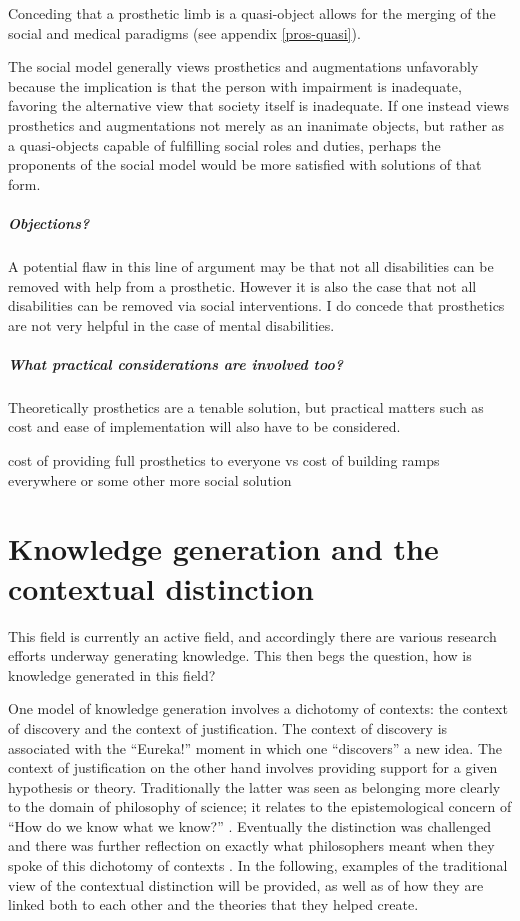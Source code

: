 \documentclass[a4paper]{article}
\begin{document}
Conceding that a prosthetic limb is a quasi-object allows for the merging of
the social and medical paradigms (see appendix \autoref{pros-quasi}).

The social model generally views prosthetics and augmentations unfavorably
because the implication is that the person with impairment is inadequate,
favoring the alternative view that society itself is inadequate. If one
instead views prosthetics and augmentations not merely as an inanimate
objects, but rather as a quasi-objects capable of fulfilling social roles and
duties, perhaps the proponents of the social model would be more satisfied
with solutions of that form.

\subparagraph{Objections?}

A potential flaw in this line of argument may be that not all disabilities can
be removed with help from a prosthetic. However it is also the case that not
all disabilities can be removed via social interventions. I do concede that
prosthetics are not very helpful in the case of mental disabilities.

\subparagraph{What practical considerations are involved too?}

Theoretically prosthetics are a tenable solution, but practical matters such as
cost and ease of implementation will also have to be considered.

cost of providing full prosthetics to everyone vs cost of building ramps
everywhere or some other more social solution


\newpage
\section{Knowledge generation and the contextual distinction}

This field is currently an active field, and accordingly there are various
research efforts underway generating knowledge. This then begs the question,
how is knowledge generated in this field?


One model of knowledge generation involves a dichotomy of contexts: the
context of discovery and the context of justification. The context of
discovery is associated with the ``Eureka!'' moment in which one ``discovers''
a new idea. The context of justification on the other hand involves providing
support for a given hypothesis or theory. Traditionally the latter was seen as
belonging more clearly to the domain of philosophy of science; it relates to
the epistemological concern of ``How do we know what we know?''
\citep{schickore2014scientific}. Eventually the distinction was challenged and
there was further reflection on exactly what philosophers meant when they
spoke of this dichotomy of contexts \citep{hoyningen2006context}. In the
following, examples of the traditional view of the contextual distinction will
be provided, as well as of how they are linked both to each other and the
theories that they helped create.
\end{document}
